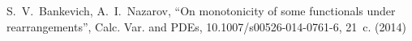 \begin{thebibliography}{99}
 S.~V.~Bankevich, A.~I.~Nazarov, ``On monotonicity of some functionals under rearrangements'', Calc. Var. and PDEs,  10.1007/s00526-014-0761-6, 21~c. (2014)
\end{thebibliography}
